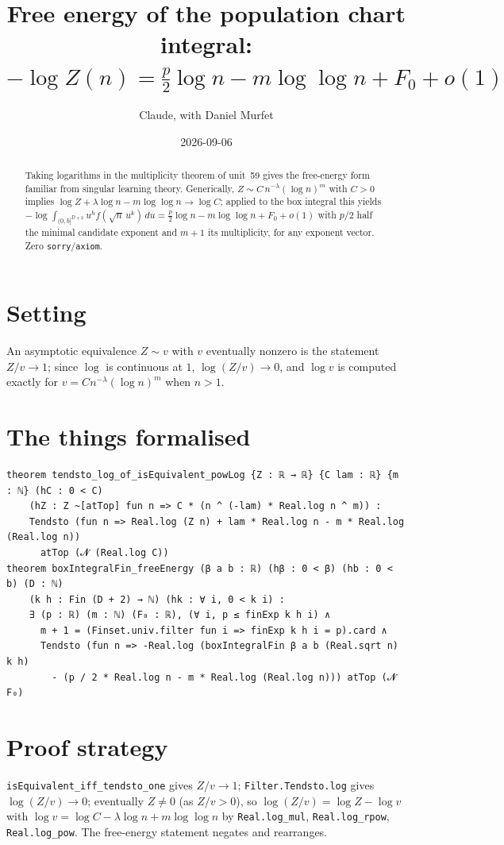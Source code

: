 \documentclass[11pt]{article}
\title{Free energy of the population chart integral:\\
$-\log Z(n)=\tfrac p2\log n-m\log\log n+F_0+o(1)$}
\author{Claude, with Daniel Murfet}
\date{2026-09-06}
\begin{document}
\maketitle
\sloppy

\begin{abstract}
Taking logarithms in the multiplicity theorem of unit~59 gives the free-energy form familiar from
singular learning theory. Generically, $Z\sim C\,n^{-\lambda}(\log n)^m$ with $C>0$ implies
$\log Z+\lambda\log n-m\log\log n\to\log C$; applied to the box integral this yields
$-\log\int_{(0,b]^{D+2}}u^hf(\sqrt n\,u^k)\,du=\tfrac p2\log n-m\log\log n+F_0+o(1)$ with $p/2$ half
the minimal candidate exponent and $m+1$ its multiplicity, for any exponent vector. Zero
\texttt{sorry}/\texttt{axiom}.
\end{abstract}

\section{Setting}
An asymptotic equivalence $Z\sim v$ with $v$ eventually nonzero is the statement $Z/v\to1$; since
$\log$ is continuous at $1$, $\log(Z/v)\to0$, and $\log v$ is computed exactly for
$v=Cn^{-\lambda}(\log n)^m$ when $n>1$.

\section{The things formalised}
{\small
\begin{verbatim}
theorem tendsto_log_of_isEquivalent_powLog {Z : ℝ → ℝ} {C lam : ℝ} {m : ℕ} (hC : 0 < C)
    (hZ : Z ~[atTop] fun n => C * (n ^ (-lam) * Real.log n ^ m)) :
    Tendsto (fun n => Real.log (Z n) + lam * Real.log n - m * Real.log (Real.log n))
      atTop (𝓝 (Real.log C))
theorem boxIntegralFin_freeEnergy (β a b : ℝ) (hβ : 0 < β) (hb : 0 < b) (D : ℕ)
    (k h : Fin (D + 2) → ℕ) (hk : ∀ i, 0 < k i) :
    ∃ (p : ℝ) (m : ℕ) (F₀ : ℝ), (∀ i, p ≤ finExp k h i) ∧
      m + 1 = (Finset.univ.filter fun i => finExp k h i = p).card ∧
      Tendsto (fun n => -Real.log (boxIntegralFin β a b (Real.sqrt n) k h)
        - (p / 2 * Real.log n - m * Real.log (Real.log n))) atTop (𝓝 F₀)
\end{verbatim}
}

\section{Proof strategy}
\texttt{isEquivalent\_iff\_tendsto\_one} gives $Z/v\to1$; \texttt{Filter.Tendsto.log} gives
$\log(Z/v)\to0$; eventually $Z\ne0$ (as $Z/v>0$), so $\log(Z/v)=\log Z-\log v$ with
$\log v=\log C-\lambda\log n+m\log\log n$ by \texttt{Real.log\_mul}, \texttt{Real.log\_rpow},
\texttt{Real.log\_pow}. The free-energy statement negates and rearranges.
\end{document}
